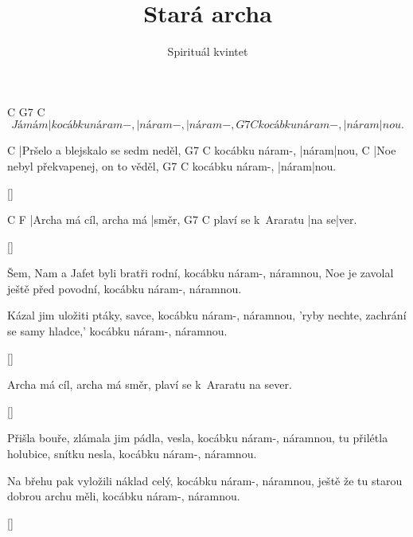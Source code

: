 \documentclass{song}
\title{Stará archa}
\author{Spirituál kvintet}
\begin{document}
          C                G7       C
\[ Já mám |kocábku náram-, |náram-, |náram-,
                G7    C
kocábku náram-, |náram|nou. \]
\endstrophe

\strophe
C
|Pršelo a blejskalo se sedm neděl, 
                G7    C
kocábku náram-, |náram|nou, 
C
|Noe nebyl překvapenej, on to věděl, 
                G7    C
kocábku náram-, |náram|nou. 
\endstrophe

\ref{}

\strophe
C                       F
|Archa má cíl, archa má |směr,
                   G7    C
plaví se k~Araratu |na se|ver.
\endstrophe

\ref{}

\begin{multicols}{2}
\strophe*
Šem, Nam a Jafet byli bratři rodní, 
kocábku náram-, náramnou, 
Noe je zavolal ještě před povodní, 
kocábku náram-, náramnou. 
\endstrophe

\strophe*
Kázal jim uložiti ptáky, savce, 
kocábku náram-, náramnou, 
'ryby nechte, zachrání se samy hladce,' 
kocábku náram-, náramnou.
\endstrophe
\end{multicols}

\ref{}

\strophe*
Archa má cíl, archa má směr,
plaví se k~Araratu na sever.
\endstrophe

\ref{}

\begin{multicols}{2}
\strophe*
Přišla bouře, zlámala jim pádla, vesla, 
kocábku náram-, náramnou, 
tu přilétla holubice, snítku nesla, 
kocábku náram-, náramnou. 
\endstrophe

\strophe*
Na břehu pak vyložili náklad celý, 
kocábku náram-, náramnou, 
ještě že tu starou dobrou archu měli, 
kocábku náram-, náramnou. 
\endstrophe
\end{multicols}

\ref{}
\end{document}
